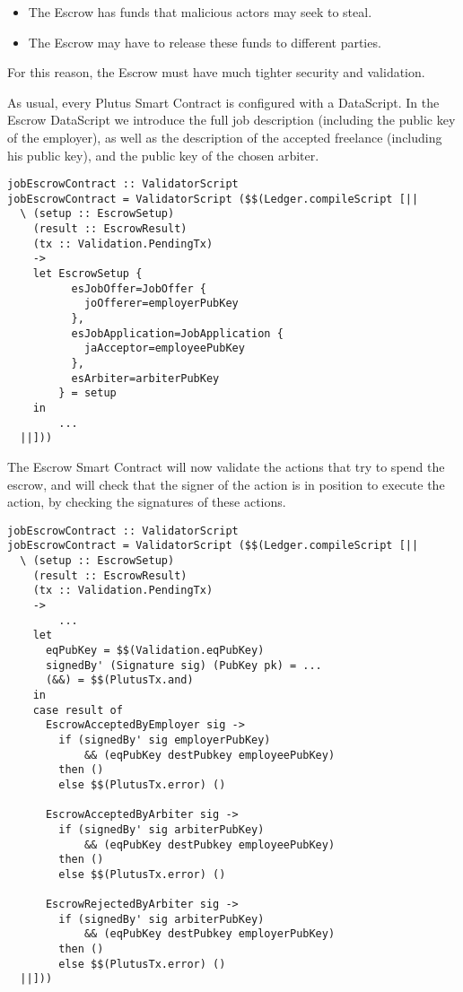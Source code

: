 \documentclass{article}
\begin{document}
\begin{itemize}
  \item The Escrow has funds that malicious actors may seek to steal.
  \item The Escrow may have to release these funds to different parties.
\end{itemize}

For this reason, the Escrow must have much tighter security and validation.

As usual, every Plutus Smart Contract is configured with a DataScript. In the Escrow DataScript we introduce the full job description (including the public key of the employer), as well as the description of the accepted freelance (including his public key), and the public key of the chosen arbiter.

\begin{samepage}
\begin{verbatim}
jobEscrowContract :: ValidatorScript
jobEscrowContract = ValidatorScript ($$(Ledger.compileScript [||
  \ (setup :: EscrowSetup)
    (result :: EscrowResult)
    (tx :: Validation.PendingTx)
    ->
    let EscrowSetup {
          esJobOffer=JobOffer {
            joOfferer=employerPubKey
          },
          esJobApplication=JobApplication {
            jaAcceptor=employeePubKey
          },
          esArbiter=arbiterPubKey
        } = setup
    in
		...
  ||]))
\end{verbatim}
\end{samepage}

The Escrow Smart Contract will now validate the actions that try to spend the escrow, and will check that the signer of the action is in position to execute the action, by checking the signatures of these actions.

\begin{samepage}
\begin{verbatim}
jobEscrowContract :: ValidatorScript
jobEscrowContract = ValidatorScript ($$(Ledger.compileScript [||
  \ (setup :: EscrowSetup)
    (result :: EscrowResult)
    (tx :: Validation.PendingTx)
    ->
		...
    let
      eqPubKey = $$(Validation.eqPubKey)
      signedBy' (Signature sig) (PubKey pk) = ...
      (&&) = $$(PlutusTx.and)
    in
    case result of
      EscrowAcceptedByEmployer sig ->
        if (signedBy' sig employerPubKey)
            && (eqPubKey destPubkey employeePubKey)
        then ()
        else $$(PlutusTx.error) ()

      EscrowAcceptedByArbiter sig ->
        if (signedBy' sig arbiterPubKey)
            && (eqPubKey destPubkey employeePubKey)
        then ()
        else $$(PlutusTx.error) ()

      EscrowRejectedByArbiter sig ->
        if (signedBy' sig arbiterPubKey)
            && (eqPubKey destPubkey employerPubKey)
        then ()
        else $$(PlutusTx.error) ()
  ||]))
\end{verbatim}
\end{samepage}
\end{document}
